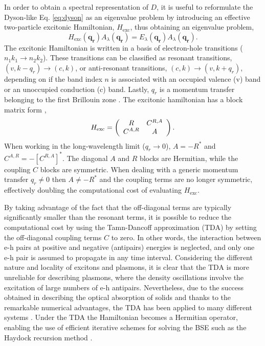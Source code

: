 \documentclass[aps,prb,10pt,showpacs,superscriptaddress,twocolumn,notitlepage]{revtex4-1}
\begin{document}
In order to obtain a spectral representation of $D$, it is useful to reformulate
the Dyson-like Eq. \ref{eq:dyson} as an eigenvalue problem \cite{rohlfingPRB00,
onidaRMP02} by introducing an effective two-particle excitonic Hamiltonian,
$H_{\mathrm{exc}}$, thus obtaining an eigenvalue problem,
\begin{equation}
H_{\mathrm{exc}}(\mathbf{q_{r}}) A_{\lambda}(\mathbf{q_{r}}) =
E_{\lambda}(\mathbf{q_{r}})      A_{\lambda}(\mathbf{q_{r}}).
\end{equation}
The excitonic Hamiltonian is written in a basis of electron-hole transitions
($n_{1}k_{1} \rightarrow n_{2}k_{2}$). These transitions can be classified as
resonant  transitions, $(v, k - q_{r}) \rightarrow (c, k)$, or anti-resonant
transitions, $(c, k) \rightarrow (v, k + q_{r})$, depending on if the band index
$n$ is associated with an occupied valence (v) band or an unoccupied conduction
(c) band. Lastly, $q_{r}$ is a momentum transfer belonging to the first
Brillouin zone \cite{gattiPRB13}. The excitonic hamiltonian has a block matrix
form \cite{gattiPRB13, albrechtPRL98, olevanoPRL01, gruningCMS11},
\begin{equation}
H_{\mathrm{exc}} =
\left(
\begin{array}{c c}
R       & C^{R,A} \\
C^{A,R} & A       \\
\end{array}
\right).
\end{equation}
When working in the long-wavelength limit ($q_{r} \rightarrow 0$), $A = -R^{*}$
and $C^{A,R} = -\left[C^{R,A}\right]^{*}$. The diagonal $A$ and $R$ blocks are
Hermitian, while the coupling $C$ blocks are symmetric. When dealing with a
generic momentum transfer $q_{r} \neq 0$ then $A \neq -R^{*}$ and the coupling
terms are no longer symmetric, effectively doubling the computational cost of
evaluating $H_{\mathrm{exc}}$.

By taking advantage of the fact that the off-diagonal terms are typically
significantly smaller than the resonant terms, it is possible to reduce the
computational cost by using the Tamn-Dancoff approximation (TDA)
\cite{fetterbook72} by setting the off-diagonal coupling terms $C$ to zero. In
other words, the interaction between e-h pairs at positive and negative
(antipairs) energies is neglected, and only one e-h pair is assumed to propagate
in any time interval. Considering the different nature and locality of excitons
and plasmons, it is clear that the TDA is more unreliable for describing
plasmons, where the density oscillations involve the excitation of large numbers
of e-h antipairs. Nevertheless, due to the success obtained in describing the
optical absorption of solids and thanks to the remarkable numerical advantages,
the TDA has been applied to many different systems \cite{luciabook}. Under the
TDA the Hamiltonian becomes a Hermitian operator, enabling the use of efficient
iterative schemes for solving the BSE such as the Haydock recursion method
\cite{haydockJPC72, haydockCPC80, benedictPRB99, roccaJCP08, gruningCMS11,
ljungbergPRB15}.
 
\end{document}

